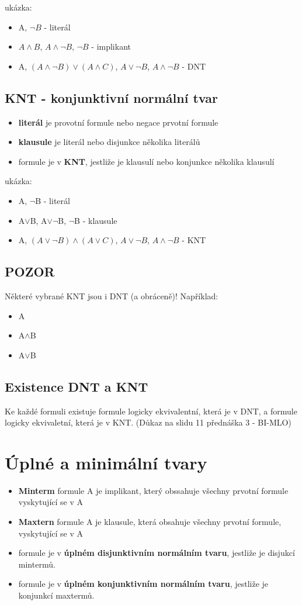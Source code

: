 \documentclass{szzclass}
\begin{document}
ukázka:
\begin{itemize}
	\item A, $\neg B$ - literál
	\item $A \wedge B$, $A \wedge \neg B$, $\neg B$ - implikant
	\item A, $(A \wedge \neg B) \vee (A \wedge C)$, $A \vee \neg B$, $A \wedge \neg B$ - DNT
\end{itemize}
\subsection{KNT - konjunktivní normální tvar}
\begin{itemize}
	\item \textbf{literál} je provotní formule nebo negace prvotní formule
	\item \textbf{klausule} je literál nebo disjunkce několika literálů
	\item formule je v \textbf{KNT}, jestliže je klausulí nebo konjunkce několika klausulí 
\end{itemize}

ukázka:
\begin{itemize}
	\item A, $\neg$B - literál
	\item A$\vee$B, A$\vee$$\neg$B, $\neg$B - klausule
	\item A, $(A \vee \neg B) \wedge (A \vee C)$, $A \vee\neg B$, $A \wedge \neg B$ - KNT
\end{itemize}

\subsection{POZOR}
Některé vybrané KNT jsou i DNT (a obráceně)! Například:
\begin{itemize}
	\item A
	\item A$\wedge$B
	\item A$\vee$B
\end{itemize}
\subsection{Existence DNT a KNT}
Ke každé formuli existuje formule logicky ekvivalentní, která je v DNT, a formule logicky ekvivaletní, která je v KNT.
(Důkaz na slidu 11 přednáška 3 - BI-MLO)
\section{Úplné a minimální tvary}
\begin{itemize}
	\item \textbf{Minterm} formule A je implikant, který obssahuje všechny prvotní formule vyskytující se v A
	\item \textbf{Maxtern} formule A je klausule, která obsahuje všechny prvotní formule, vyskytující se v A
	\item formule je v \textbf{úplném disjunktivním normálním tvaru}, jestliže je disjukcí mintermů.
	\item formule je v \textbf{úplném konjunktivním normálním tvaru}, jestliže je konjunkcí maxtermů.
\end{itemize}
\end{document}
